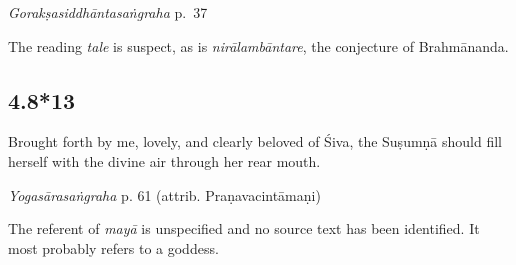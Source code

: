 \begin{ekdosis}
\begin{testimonia}[hp04_008_12]
\emph{Gorakṣasiddhāntasaṅgraha} p.~37
\begin{versinnote}
\end{versinnote}
\end{testimonia}

\begin{philcomm}[hp04_008_12]
The reading \emph{tale} is suspect, as is \emph{nirālambāntare}, the conjecture of Brahmānanda.
\end{philcomm}

\subsection*{4.8*13}
\begin{translation}[hp04_008_13]
Brought forth by me, lovely, and clearly beloved of Śiva, the Suṣumṇā should fill herself with the divine air through her rear mouth.
\end{translation}


\begin{testimonia}[hp04_008_13]
\emph{Yogasārasaṅgraha} p. 61 (attrib. Praṇavacintāmaṇi)
\begin{versinnote}
\end{versinnote}
\end{testimonia}

\begin{philcomm}[hp04_008_13]
The referent of \emph{mayā} is unspecified and no source text has been identified. It most probably refers to a goddess.%
\end{philcomm}


\end{ekdosis}
